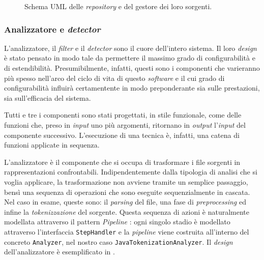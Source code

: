 \begin{figure}[h!]
    \caption{Schema UML delle \textit{repository} e del gestore dei loro sorgenti.}
    \label{img:02-repos}
\end{figure}

\subsubsection*{Analizzatore e \textit{detector}}
L'analizzatore, il \textit{filter} e il \textit{detector} sono il cuore dell'intero sistema.
%
Il loro \textit{design} è stato pensato in modo tale da permettere il massimo grado di configurabilità e di estendibilità.
%
Presumibilmente, infatti, questi sono i componenti che varieranno più spesso nell'arco del ciclo di vita di questo \textit{software} e il cui grado di configurabilità influirà certamentente in modo preponderante sia sulle prestazioni, sia sull'efficacia del sistema.

Tutti e tre i componenti sono stati progettati, in stile funzionale, come delle funzioni che, preso in \textit{input} uno più argomenti, ritornano in \textit{output} l'\textit{input} del componente successivo.
%
L'esecuzione di una tecnica è, infatti, una catena di funzioni applicate in sequenza.

L'analizzatore è il componente che si occupa di trasformare i file sorgenti in rappresentazioni confrontabili.
%
Indipendentemente dalla tipologia di analisi che si voglia applicare, la trasformazione non avviene tramite un semplice passaggio, bensì una sequenza di operazioni che sono eseguite sequenzialmente in cascata.
%
Nel caso in esame, queste sono: il \textit{parsing} del file, una fase di \textit{preprocessing} ed infine la \textit{tokenizzazione} del sorgente.
%
Questa sequenza di azioni è naturalmente modellata attraverso il pattern \textit{Pipeline} \cite{pipeline-pattern}: ogni singolo stadio è modellato attraverso l'interfaccia \texttt{StepHandler} e la \textit{pipeline} viene costruita all'interno del concreto \texttt{Analyzer}, nel nostro caso \texttt{JavaTokenizationAnalyzer}.
%
Il \textit{design} dell'analizzatore è esemplificato in .

